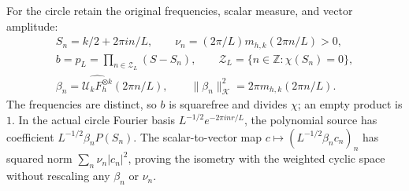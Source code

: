 For the circle retain the original frequencies, scalar measure, and
vector amplitude:
\[
 \begin{gathered}
 S_n=k/2+2\pi i n/L,\qquad
 \nu_n=(2\pi/L)m_{h,k}(2\pi n/L)>0,\\
 b=p_L=\prod_{n\in\mathcal Z_L}(S-S_n),\qquad
 \mathcal Z_L=\{n\in\mathbb Z:\chi(S_n)=0\},\\
 \beta_n=\widehat{\mathcal U_kF_h^{\otimes k}}(2\pi n/L),
 \qquad \|\beta_n\|_{\mathcal K}^2=2\pi m_{h,k}(2\pi n/L).
 \end{gathered}
 \tag{DC6}
\]
The frequencies are distinct, so $b$ is squarefree and divides
$\chi$; an empty product is $1$.
In the actual circle Fourier basis
$L^{-1/2}e^{-2\pi i nr/L}$, the polynomial source has coefficient
$L^{-1/2}\beta_nP(S_n)$.
The scalar-to-vector map
$c\mapsto(L^{-1/2}\beta_nc_n)_n$ has squared norm
$\sum_n\nu_n|c_n|^2$, proving the isometry with the weighted cyclic
space without rescaling any $\beta_n$ or $\nu_n$.

